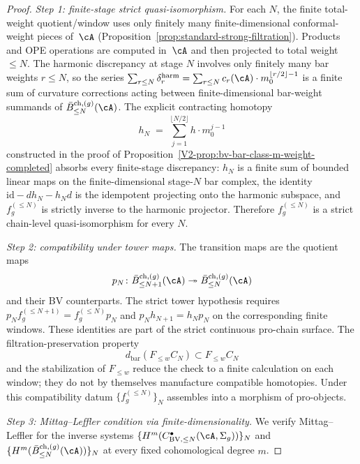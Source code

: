 \begin{proof}
\emph{Step 1: finite-stage strict quasi-isomorphism.} For each $N$, the
finite total-weight quotient/window uses only finitely many
finite-dimensional conformal-weight pieces of~$\cA$
\textup{(}Proposition~\textup{\ref{prop:standard-strong-filtration}}\textup{)}.
Products and OPE operations are computed in~$\cA$ and then projected
to total weight~$\leq N$.
The harmonic discrepancy at stage $N$ involves only finitely many bar
weights $r \leq N$, so the series
$\sum_{r \leq N} \delta_r^{\mathrm{harm}} = \sum_{r \leq N} c_r(\cA) \cdot m_0^{\lfloor r/2 \rfloor - 1}$
is a finite sum of curvature corrections acting between finite-dimensional
bar-weight summands of $\bar B^{\mathrm{ch}, (g)}_{\leq N}(\cA)$. The
explicit contracting homotopy
\[
h_N
\;=\;
\sum_{j=1}^{\lfloor N/2 \rfloor}
h \cdot m_0^{j-1}
\]
constructed in the proof of
Proposition~\textup{\ref{V2-prop:bv-bar-class-m-weight-completed}}
absorbs every finite-stage discrepancy: $h_N$ is a finite sum of bounded
linear maps on the finite-dimensional stage-$N$ bar complex, the
identity $\mathrm{id} - d h_N - h_N d$ is the idempotent projecting onto
the harmonic subspace, and $f_g^{(\leq N)}$ is strictly inverse to the
harmonic projector. Therefore $f_g^{(\leq N)}$ is a strict chain-level
quasi-isomorphism for every $N$.

\emph{Step 2: compatibility under tower maps.} The transition maps are
the quotient maps
\[
p_N\colon \bar B^{\mathrm{ch},(g)}_{\leq N+1}(\cA)
\twoheadrightarrow
\bar B^{\mathrm{ch},(g)}_{\leq N}(\cA)
\]
and their BV counterparts. The strict tower hypothesis requires
$p_N f_g^{(\leq N+1)}=f_g^{(\leq N)}p_N$ and
$p_N h_{N+1}=h_Np_N$ on the corresponding finite windows. These
identities are part of the strict continuous pro-chain surface. The
filtration-preservation property
\[
d_{\mathrm{bar}}(F_{\leq w}C_N)\subset F_{\leq w}C_N
\]
and the stabilization of $F_{\leq w}$ reduce the check to a finite
calculation on each window; they do not by themselves manufacture
compatible homotopies. Under this compatibility datum
$\{f_g^{(\leq N)}\}_N$ assembles into a morphism of pro-objects.

\emph{Step 3: Mittag--Leffler condition via finite-dimensionality.} We
verify Mittag--Leffler for the inverse systems
$\{H^m(C^{\bullet}_{\mathrm{BV},\leq N}(\cA, \Sigma_g))\}_N$ and
$\{H^m(\bar B^{\mathrm{ch}, (g)}_{\leq N}(\cA))\}_N$ at every fixed
cohomological degree $m$.


\end{proof}
